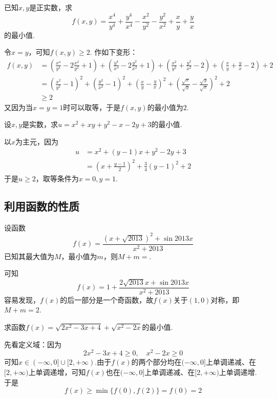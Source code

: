 \documentclass[cn,hazy,black,10pt,normal]{elegantnote}
\newenvironment{guess}{
  \color{guess}}{\newline \color{black}}
\newcommand{\tk}{\uline{\hspace{4em}}}
\newcommand{\ssb}[1]{\left( #1 \right)}
\begin{document}
\begin{problem} %
	已知$x,y$是正实数，求$$f(x,y) = \frac{x^4}{y^4} + \frac{y^4}{x^4} - \frac{x^2}{y^2} - \frac{y^2}{x^2} + \frac{x}{y} + \frac{y}{x}$$的最小值.
\end{problem}
\begin{solution}
	\begin{guess}
		令$x=y$，可知$f(x,y) \geq 2$.
	\end{guess}
	作如下变形：
	\begin{align*}
		f(x,y) &= \ssb{\frac{x^4}{y^4} - 2\frac{x^2}{y^2} +1} + \ssb{\frac{y^4}{x^4} - 2\frac{y^2}{x^2} + 1} + \ssb{\frac{x^2}{y^2} + \frac{y^2}{x^2} - 2} + \ssb{\frac{x}{y} + \frac{y}{x} - 2} + 2 \\
		&= \ssb{\frac{x^2}{y^2} - 1}^2 + \ssb{\frac{y^2}{x^2} - 1}^2 + \ssb{\frac{x}{y} - \frac{y}{x}}^2 + \ssb{\frac{\sqrt{x}}{\sqrt{y}} - \frac{\sqrt{y}}{\sqrt{x}}}^2 + 2 \\
		&\geq 2
	\end{align*}
	又因为当$x=y=1$时可以取等，于是$f(x,y)$的最小值为$2$.
\end{solution}

\begin{problem} %
	设$x,y$是实数，求$u = x^2+xy+y^2-x-2y+3$的最小值.
\end{problem}
\begin{solution}
	以$x$为主元，因为
	\begin{align*}
		u &= x^2 + (y-1)x + y^2-2y+3 \\
		&= \ssb{x+\frac{y-1}{2}}^2 + \frac{3}{4}(y-1)^2 + 2
	\end{align*}
	于是$u \geq 2$，取等条件为$x=0,y=1$.
\end{solution}

\subsection{利用函数的性质}

\begin{problem} %
	设函数$$f(x) = \frac{(x+\sqrt{2013})^2 + \sin 2013x}{x^2 + 2013}$$
	已知其最大值为$M$，最小值为$m$，则$M+m=$\tk .
\end{problem}
\begin{solution}
	可知$$f(x) = 1 + \frac{2\sqrt{2013}x+\sin 2013x}{x^2+2013}$$
	容易发现，$f(x)$的后一部分是一个奇函数，故$f(x)$关于$(1,0)$对称，即$M+m=2$.
\end{solution}

\begin{problem} %
	求函数$f(x) = \sqrt{2x^2-3x+4} + \sqrt{x^2-2x}$的最小值.
\end{problem}
\begin{solution}
	先看定义域：因为$$2x^2-3x+4 \geq 0, \quad x^2-2x \geq 0$$
	可知$x \in (-\infty ,0] \cup [2,+\infty )$.由于$f(x)$的两个部分均在$(-\infty ,0]$上单调递减、在$[2,+\infty )$上单调递增，可知$f(x)$也在$(-\infty ,0]$上单调递减、在$[2,+\infty )$上单调递增.于是$$f(x) \geq \min \{ f(0),f(2) \} = f(0) = 2$$
\end{solution}
\end{document}

